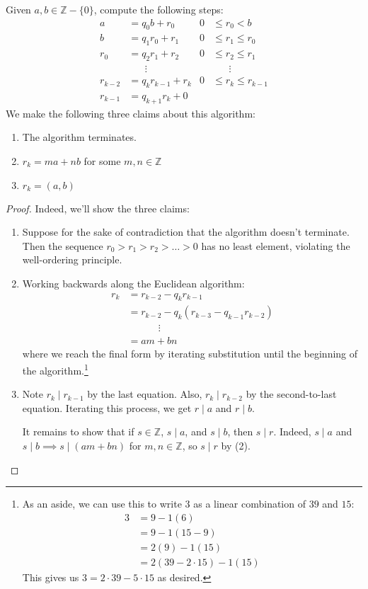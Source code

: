 \documentclass{article}
\theoremstyle{plain}
\newcommand{\Z}{\mathbb{Z}}
\begin{document}
\begin{itemize}
\begin{theorem}{}{}
Given $a,b \in \Z - \{0\}$, compute the following steps:
\begin{align*}
a &= q_0b + r_0	&0& \le r_0 < b \\
b &= q_1r_0 + r_1	&0& \le r_1 \le r_0 \\
r_0 &= q_2r_1 + r_2	&0& \le r_2 \le r_1 \\
&\phantom{test}\vdots &&\phantom{test}\vdots \\
r_{k-2} &= q_kr_{k-1} + r_{k}	&0& \le r_{k} \le r_{k-1} \\
r_{k-1} &= q_{k+1}r_k + 0
\end{align*}
We make the following three claims about this algorithm:
\begin{enumerate}
\item The algorithm terminates.
\item $r_k = ma + nb$ for some $m,n \in \Z$
\item $r_k = (a,b)$
\end{enumerate}
\end{theorem}
\begin{proof}
Indeed, we'll show the three claims:
\begin{enumerate}
\item Suppose for the sake of contradiction that the algorithm doesn't terminate. Then the sequence $r_0 > r_1 > r_2 > \dots > 0$ has no least element, violating the well-ordering principle.
\item Working backwards along the Euclidean algorithm:
\begin{align*}
r_k 	&= r_{k-2} - q_kr_{k-1} \\
	&= r_{k-2} - q_k(r_{k-3}-q_{k-1}r_{k-2}) \\
	&\phantom{testing}\vdots \\
	&= am + bn
\end{align*}
where we reach the final form by iterating substitution until the beginning of the algorithm.\footnote{As an aside, we can use this to write $3$ as a linear combination of $39$ and $15$:
\begin{align*}
3 &= 9 - 1(6) \\
&= 9 - 1(15-9) \\
&= 2(9) - 1(15) \\
&= 2(39-2\cdot 15) - 1(15)
\end{align*}
This gives us $3 = 2\cdot 39-5\cdot 15$ as desired.}
\item Note $r_k\mid r_{k-1}$ by the last equation. Also, $r_k\mid r_{k-2}$ by the second-to-last equation. Iterating this process, we get $r\mid a$ and $r\mid b$.

It remains to show that if $s \in \Z$, $s\mid a$, and $s\mid b$, then $s\mid r$. Indeed, $s\mid a$ and $s\mid b \implies s\mid(am+bn)$ for $m,n\in\Z$, so $s\mid r$ by (2).
\end{enumerate}
\end{proof}
\end{itemize}
\end{document}
